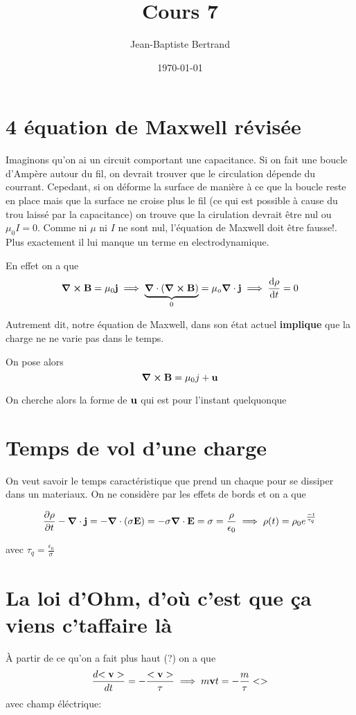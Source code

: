\documentclass{article}
\title{Cours 7}
\author{Jean-Baptiste Bertrand}
\date{\today}
\begin{document}
\maketitle

\section{4 équation de Maxwell révisée}

Imaginons qu'on ai un circuit comportant une capacitance. Si on fait une boucle d'Ampère autour du fil, on devrait trouver que le circulation dépende du courrant. Cepedant, si on déforme la surface de manière à ce que la boucle reste en place mais que la surface ne croise plus le fil (ce qui est possible à cause du trou laissé par la capacitance) on trouve que la cirulation devrait être nul ou $\mu_0 I =0$. Comme ni $\mu$ ni $I$ ne sont nul, l'équation de Maxwell doit être fausse!. Plus exactement il lui manque un terme en electrodynamique.


En effet on a que $$\grad \cross \vb B = \mu_0\vb j \implies \underbrace{\grad \cdot(\grad\cross\vb B)}_{0} = \mu_o \grad \cdot \vb j\implies \dv{\rho}{t}=0$$ 

Autrement dit, notre équation de Maxwell, dans son état actuel \textbf{implique} que la charge ne ne varie pas dans le temps.

On pose alors $$\grad \cross \vb B = \mu_0 j + \vb u$$ 

On cherche alors la forme de $\vb u$ qui est pour l'instant quelquonque

\section{Temps de vol d'une charge}

On veut savoir le temps caractéristique que prend un chaque pour se dissiper dans un materiaux. On ne considère par les effets de bords et on a que 

$$\frac{\partial {\rho}}{\partial {t}} -\grad\cdot\vb j = -\grad\cdot (\sigma \vb E) = -\sigma \grad \cdot \vb E = \-\sigma =\frac{\rho}{\epsilon_0} \implies \rho(t) = \rho_0e^{-t\over\tau_q}$$ 

avec $\tau_q = \frac{\epsilon_0}{\sigma}$ 

\section{La loi d'Ohm, d'où c'est que ça viens c'taffaire là}

À partir de ce qu'on a fait plus haut (?) on a que $$\frac{d {<\vb v>}}{d {t}} = - \frac{<\vb v>}{\tau} \implies m {\vb v}{t} = -\frac{m}{\tau} <>
$$ 
avec champ éléctrique: 
\end{document}
